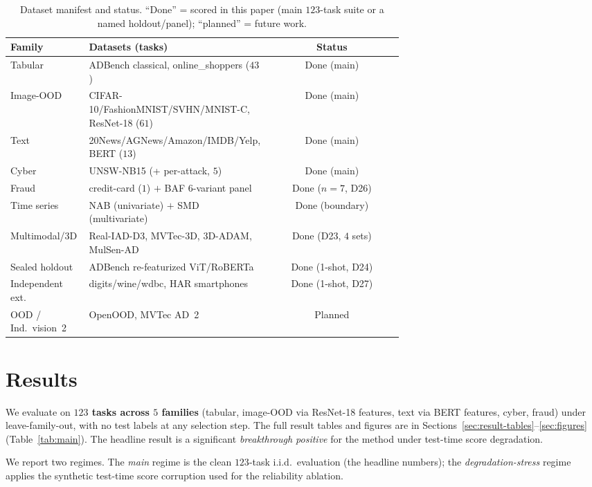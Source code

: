 \documentclass[10pt,conference]{IEEEtran}
\begin{document}
\begin{table}[t]
\centering
\caption{Dataset manifest and status. ``Done'' = scored in this paper (main $123$-task
suite or a named holdout/panel); ``planned'' = future work.}
\label{tab:manifest}
\footnotesize
\begin{tabular}{L{0.20\linewidth}L{0.46\linewidth}c}
\toprule
\textbf{Family} & \textbf{Datasets (tasks)} & \textbf{Status} \\
\midrule
Tabular & ADBench classical, online\_shoppers ($43$) & Done (main) \\
Image-OOD & CIFAR-10/FashionMNIST/SVHN/MNIST-C, ResNet-18 ($61$) & Done (main) \\
Text & 20News/AGNews/Amazon/IMDB/Yelp, BERT ($13$) & Done (main) \\
Cyber & UNSW-NB15 (+ per-attack, $5$) & Done (main) \\
Fraud & credit-card ($1$) $+$ BAF $6$-variant panel & Done ($n{=}7$, D26) \\
Time series & NAB (univariate) $+$ SMD (multivariate) & Done (boundary) \\
Multimodal/3D & Real-IAD-D3, MVTec-3D, 3D-ADAM, MulSen-AD & Done (D23, $4$ sets) \\
Sealed holdout & ADBench re-featurized ViT/RoBERTa & Done (1-shot, D24) \\
Independent ext. & digits/wine/wdbc, HAR smartphones & Done (1-shot, D27) \\
OOD / Ind.\ vision~2 & OpenOOD, MVTec AD~2 & Planned \\
\bottomrule
\end{tabular}
\end{table}

\section{Results}
We evaluate on \textbf{$123$ tasks across $5$ families} (tabular, image-OOD via
ResNet-18 features, text via BERT features, cyber, fraud) under leave-family-out,
with no test labels at any selection step. The full result tables and figures are
in Sections~\ref{sec:result-tables}--\ref{sec:figures}
(Table~\ref{tab:main}). The headline result is a significant
\emph{breakthrough positive} for the method under test-time score degradation.

We report two regimes. The \emph{main} regime is the clean $123$-task i.i.d.\
evaluation (the headline numbers); the \emph{degradation-stress} regime applies the
synthetic test-time score corruption used for the reliability ablation.
\end{document}
